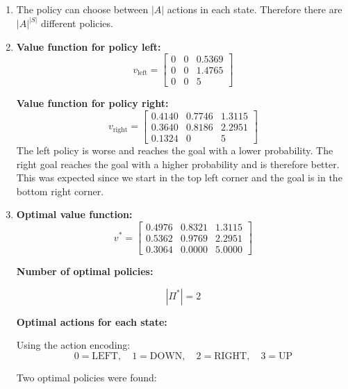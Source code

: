 \documentclass[12pt]{scrartcl}
\begin{document}
\begin{enumerate}
      \item The policy can choose between $|A|$ actions in each state. Therefore there are $|A|^{|S|}$ different policies.
      \item \textbf{Value function for policy left:}
                  \[
                  v_{\text{left}} =
                  \begin{bmatrix}
                  0 & 0 & 0.5369 \\
                  0 & 0 & 1.4765 \\
                  0 & 0 & 5
                  \end{bmatrix}
                  \]

                  \textbf{Value function for policy right:}
                  \[
                  v_{\text{right}} =
                  \begin{bmatrix}
                  0.4140 & 0.7746 & 1.3115 \\
                  0.3640 & 0.8186 & 2.2951 \\
                  0.1324 & 0 & 5
                  \end{bmatrix}
                  \]
            The left policy is worse and reaches the goal with a lower probability.
            The right goal reaches the goal with a higher probability and is therefore better.
            This was expected since we start in the top left corner and the goal is in the bottom right corner.
      \item \textbf{Optimal value function:}
            \[
            v^* =
            \begin{bmatrix}
            0.4976 & 0.8321 & 1.3115 \\
            0.5362 & 0.9769 & 2.2951 \\
            0.3064 & 0.0000 & 5.0000
            \end{bmatrix}
            \]

            \textbf{Number of optimal policies:}

            \[
            |\Pi^*| = 2
            \]

            \textbf{Optimal actions for each state:}

            Using the action encoding:
            \[
            0 = \text{LEFT}, \quad 1 = \text{DOWN}, \quad 2 = \text{RIGHT}, \quad 3 = \text{UP}
            \]

            Two optimal policies were found:


\end{enumerate}
\end{document}
